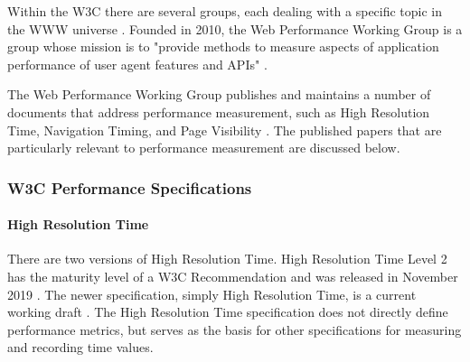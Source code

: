 
Within the W3C there are several groups, each dealing with a specific topic in the WWW universe \cite{2021W3CWorkingGroups}.
Founded in 2010, the Web Performance Working Group is a group whose mission is to "provide methods to measure aspects of application performance of user agent features and APIs" \cite{2021W3CWebPerformanceWorkingGroup}.


The Web Performance Working Group publishes and maintains a number of documents that address performance measurement, such as High Resolution Time, Navigation Timing, and Page Visibility \cite{2021W3CWebPerformanceWorkingGroupPublications}.
The published papers that are particularly relevant to performance measurement are discussed below.





\subsubsection{W3C Performance Specifications}
\label{subsubsection:w3c_performance_specifications}


\paragraph{High Resolution Time} %

There are two versions of High Resolution Time.
High Resolution Time Level 2 has the maturity level of a W3C Recommendation and was released in November 2019 \cite{2019W3CHRTime2}.
The newer specification, simply High Resolution Time, is a current working draft \cite{2021W3CHRTime}.
The High Resolution Time specification does not directly define performance metrics, but serves as the basis for other specifications for measuring and recording time values.

